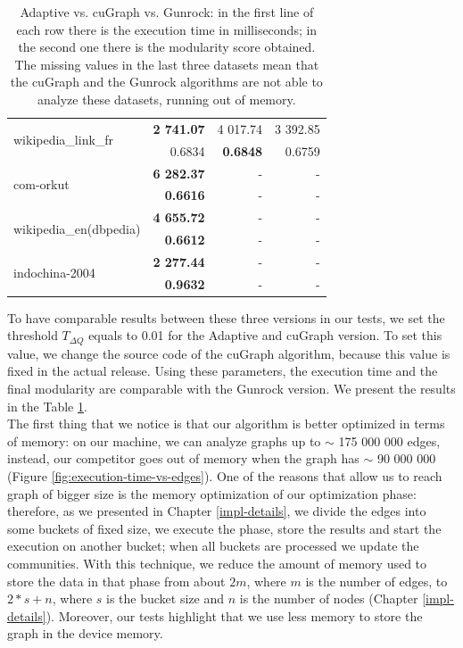 \begin{table}[t!]
\begin{tabular}{ |l||r||r|r|}
		\multirow{ 2}{*}{wikipedia\_link\_fr} 		& \textbf{2 741.07 }	& 4 017.74	& 3 392.85 \\
													& 0.6834	&\textbf{ 0.6848}	& 0.6759  \\\hline
		\multirow{ 2}{*}{com-orkut }				& \textbf{6 282.37}	& -		 	& - \\
													& \textbf{0.6616}	& - 		& - \\\hline
		\multirow{ 2}{*}{wikipedia\_en(dbpedia)}	& \textbf{4 655.72}	& -			& - \\
													& \textbf{0.6612 }	& - 		& - \\\hline
		\multirow{ 2}{*}{indochina-2004}			& \textbf{2 277.44} & - 		& - \\
													& \textbf{0.9632}	& - 		& - \\\hline
	\end{tabular}
	\caption{\label{tab:ad-cu-gun} Adaptive vs. cuGraph vs. Gunrock:  in the first line of each row there is the execution time in milliseconds; in the second one there is the modularity score obtained. The missing values in the last three datasets mean that the cuGraph and the Gunrock algorithms are not able to analyze these datasets, running out of memory. }
\end{table} 
To have comparable results between these three versions in our tests, we set the threshold $T_{\Delta Q}$ equals to 0.01 for the Adaptive and cuGraph version. To set this value, we change the source code of the cuGraph algorithm, because this value is fixed in the actual release. Using these parameters, the execution time and the final modularity are comparable with the Gunrock version. We present the results in the Table \ref{tab:ad-cu-gun}. \\
The first thing that we notice is that our algorithm is better optimized in terms of memory: on our machine, we can analyze graphs up to $\sim$ 175 000 000 edges, instead, our competitor goes out of memory when the graph has $\sim$ 90 000 000 (Figure \ref{fig:execution-time-vs-edges}). One of the reasons that allow us to reach graph of bigger size is the memory optimization of our optimization phase: therefore, as we presented in Chapter \ref{impl-details}, we divide the edges into some buckets of fixed size, we execute the phase, store the results and start the execution on another bucket; when all buckets are processed we update the communities. With this technique, we reduce the amount of memory used to store the data in that phase from about $2m$, where $m$ is the number of edges, to $2 * s + n$, where $s$ is the bucket size and $n$ is the number of nodes (Chapter \ref{impl-details}). Moreover, our tests highlight that we use less memory to store the graph in the device memory. \\
